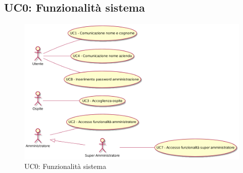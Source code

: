 \subsection{UC0: Funzionalità sistema}
\label{UC0}
\begin{figure}[h]
\centering
\includegraphics[width=\textwidth,height=\textheight,keepaspectratio]{images/UseCase.png}
\caption{UC0: Funzionalità sistema}
\end{figure}
